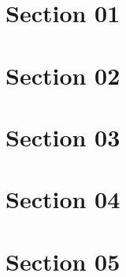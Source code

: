 \section{Section 01}
\begin{theorem}[Theorem 01]
    \label{th:01}
    \lipsum[1]
\end{theorem}

\begin{definition}[Definition 01]
    \label{def:01}
    \lipsum[1]
\end{definition}

\begin{note}
    \lipsum[1]
\end{note}

\begin{example}[Example 01]
    \lipsum[1]
\end{example}

\begin{problem}[Problem 01]
    \lipsum[1]\newline
    \begin{solution}
        \lipsum[1]
    \end{solution}
\end{problem}

\section{Section 02}
\lipsum[1]

\section{Section 03}
\lipsum[1]

\section{Section 04}
\lipsum[1]

\section{Section 05}
\lipsum[1]
